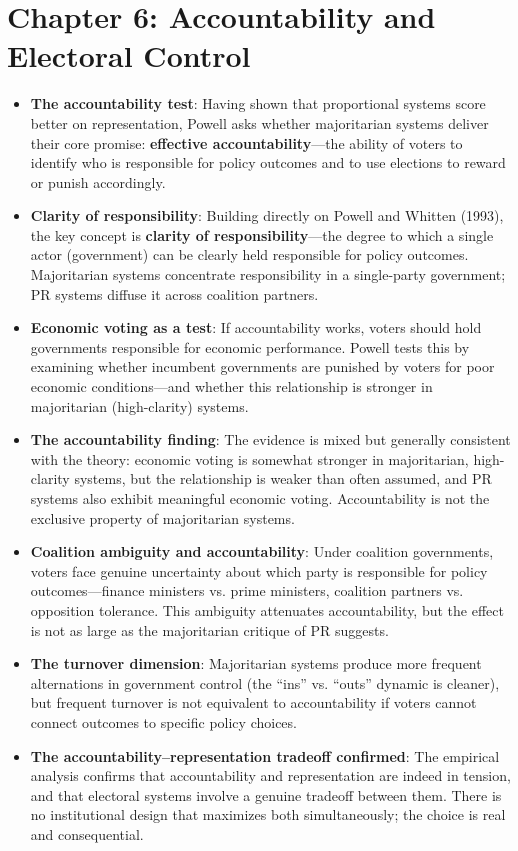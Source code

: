 \documentclass[12pt]{article}
\begin{document}
\section{Chapter 6: Accountability and Electoral Control}

\begin{itemize}[leftmargin=*, itemsep=4pt]
    \item \textbf{The accountability test}: Having shown that proportional systems score better on representation, Powell asks whether majoritarian systems deliver their core promise: \textbf{effective accountability}---the ability of voters to identify who is responsible for policy outcomes and to use elections to reward or punish accordingly.
    \item \textbf{Clarity of responsibility}: Building directly on Powell and Whitten (1993), the key concept is \textbf{clarity of responsibility}---the degree to which a single actor (government) can be clearly held responsible for policy outcomes. Majoritarian systems concentrate responsibility in a single-party government; PR systems diffuse it across coalition partners.
    \item \textbf{Economic voting as a test}: If accountability works, voters should hold governments responsible for economic performance. Powell tests this by examining whether incumbent governments are punished by voters for poor economic conditions---and whether this relationship is stronger in majoritarian (high-clarity) systems.
    \item \textbf{The accountability finding}: The evidence is mixed but generally consistent with the theory: economic voting is somewhat stronger in majoritarian, high-clarity systems, but the relationship is weaker than often assumed, and PR systems also exhibit meaningful economic voting. Accountability is not the exclusive property of majoritarian systems.
    \item \textbf{Coalition ambiguity and accountability}: Under coalition governments, voters face genuine uncertainty about which party is responsible for policy outcomes---finance ministers vs. prime ministers, coalition partners vs. opposition tolerance. This ambiguity attenuates accountability, but the effect is not as large as the majoritarian critique of PR suggests.
    \item \textbf{The turnover dimension}: Majoritarian systems produce more frequent alternations in government control (the ``ins'' vs. ``outs'' dynamic is cleaner), but frequent turnover is not equivalent to accountability if voters cannot connect outcomes to specific policy choices.
    \item \textbf{The accountability--representation tradeoff confirmed}: The empirical analysis confirms that accountability and representation are indeed in tension, and that electoral systems involve a genuine tradeoff between them. There is no institutional design that maximizes both simultaneously; the choice is real and consequential.
\end{itemize}
\end{document}
